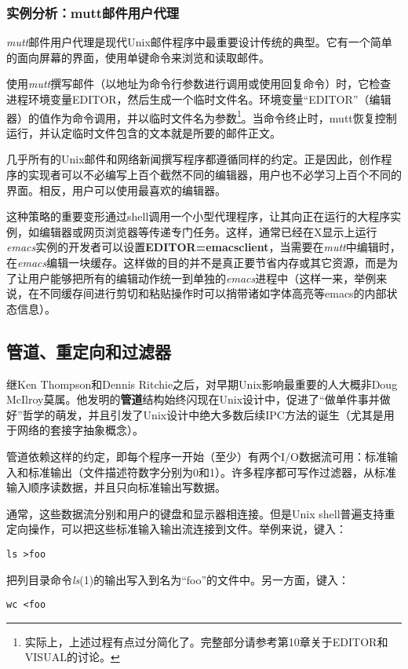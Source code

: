 \documentclass[12pt,oneside]{ctexbook}
\begin{document}
\begin{common-format}
\subsubsection{实例分析：mutt邮件用户代理}
\textit{mutt}邮件用户代理是现代Unix邮件程序中最重要设计传统的典型。它有一个简单的面向屏幕的界面，使用单键命令来浏览和读取邮件。

使用\textit{mutt}撰写邮件（以地址为命令行参数进行调用或使用回复命令）时，它检查进程环境变量EDITOR，然后生成一个临时文件名。环境变量“EDITOR”（编辑器）的值作为命令调用，并以临时文件名为参数\footnote{实际上，上述过程有点过分简化了。完整部分请参考第10章关于EDITOR和VISUAL的讨论。}。当命令终止时，mutt恢复控制运行，并认定临时文件包含的文本就是所要的邮件正文。

几乎所有的Unix邮件和网络新闻撰写程序都遵循同样的约定。正是因此，创作程序的实现者可以不必编写上百个截然不同的编辑器，用户也不必学习上百个不同的界面。相反，用户可以使用最喜欢的编辑器。

这种策略的重要变形通过shell调用一个小型代理程序，让其向正在运行的大程序实例，如编辑器或网页浏览器等传递专门任务。这样，通常已经在X显示上运行\textit{emacs}实例的开发者可以设置\textbf{EDITOR=emacsclient}，当需要在\textit{mutt}中编辑时，在\textit{emacs}编辑一块缓存。这样做的目的并不是真正要节省内存或其它资源，而是为了让用户能够把所有的编辑动作统一到单独的\textit{emacs}进程中（这样一来，举例来说，在不同缓存间进行剪切和粘贴操作时可以捎带诸如字体高亮等emacs的内部状态信息）。

\subsection{管道、重定向和过滤器}
继Ken Thompson和Dennis Ritchie之后，对早期Unix影响最重要的人大概非Doug McIlroy莫属。他发明的\textbf{管道}结构始终闪现在Unix设计中，促进了“做单件事并做好”哲学的萌发，并且引发了Unix设计中绝大多数后续IPC方法的诞生（尤其是用于网络的套接字抽象概念）。

管道依赖这样的约定，即每个程序一开始（至少）有两个I/O数据流可用：标准输入和标准输出（文件描述符数字分别为0和1）。许多程序都可写作过滤器，从标准输入顺序读数据，并且只向标准输出写数据。

通常，这些数据流分别和用户的键盘和显示器相连接。但是Unix shell普遍支持重定向操作，可以把这些标准输入输出流连接到文件。举例来说，键入：
\begin{Verbatim}
ls >foo
\end{Verbatim}


把列目录命令\textit{ls}(1)的输出写入到名为“foo”的文件中。另一方面，键入：
\begin{Verbatim}
wc <foo
\end{Verbatim}



\end{common-format}
\end{document}
